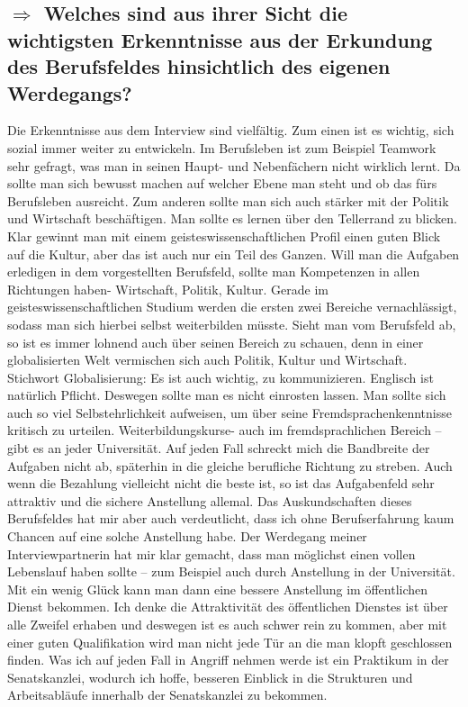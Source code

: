 \documentclass[12pt,headsepline,a4paper]{scrartcl}
\newcommand\quest[1]{\subsection*{$\Rightarrow$ #1}}
\begin{document}
\quest{Welches sind aus ihrer Sicht die wichtigsten Erkenntnisse aus der Erkundung des Berufsfeldes hinsichtlich des eigenen Werdegangs?}
Die Erkenntnisse aus dem Interview sind vielfältig. Zum einen ist es wichtig, sich sozial immer weiter zu entwickeln. Im Berufsleben ist zum Beispiel Teamwork sehr gefragt, was man in seinen Haupt- und Nebenfächern nicht wirklich lernt. Da sollte man sich bewusst machen auf welcher Ebene man steht und ob das fürs Berufsleben ausreicht.
Zum anderen sollte man sich auch stärker mit der Politik und Wirtschaft beschäftigen. Man sollte es lernen über den Tellerrand zu blicken. Klar gewinnt man mit einem geisteswissenschaftlichen Profil einen guten Blick auf die Kultur, aber das ist auch nur ein Teil des Ganzen. Will man die Aufgaben erledigen in dem  vorgestellten Berufsfeld, sollte man Kompetenzen in allen Richtungen haben- Wirtschaft, Politik, Kultur. Gerade im geisteswissenschaftlichen Studium werden die ersten zwei Bereiche vernachlässigt, sodass man sich hierbei selbst weiterbilden müsste. Sieht man vom Berufsfeld ab, so ist es immer lohnend auch über seinen Bereich zu schauen, denn in einer globalisierten Welt vermischen sich auch Politik, Kultur und Wirtschaft. 
Stichwort Globalisierung: Es ist auch wichtig, zu kommunizieren. Englisch ist natürlich Pflicht. Deswegen sollte man es nicht einrosten lassen. Man sollte sich auch so viel Selbstehrlichkeit aufweisen, um über seine Fremdsprachenkenntnisse kritisch zu urteilen. Weiterbildungskurse- auch im fremdsprachlichen Bereich – gibt es an jeder Universität.
Auf jeden Fall schreckt mich die Bandbreite der Aufgaben nicht ab, späterhin in die gleiche berufliche Richtung zu streben. Auch wenn die Bezahlung vielleicht nicht die beste ist, so ist das Aufgabenfeld sehr attraktiv und die sichere Anstellung allemal. Das Auskundschaften dieses Berufsfeldes hat mir aber auch verdeutlicht, dass ich ohne Berufserfahrung kaum Chancen auf eine solche Anstellung habe. Der Werdegang meiner Interviewpartnerin hat mir klar gemacht, dass man möglichst einen vollen Lebenslauf haben sollte -- zum Beispiel auch durch Anstellung in der Universität. Mit ein wenig Glück kann man dann eine bessere Anstellung im öffentlichen Dienst bekommen.
Ich denke die Attraktivität des öffentlichen Dienstes ist über alle Zweifel erhaben und deswegen ist es auch schwer rein zu kommen, aber mit einer guten Qualifikation wird man nicht jede Tür an die man klopft geschlossen finden. 
Was ich auf jeden Fall in Angriff nehmen werde ist ein Praktikum in der Senatskanzlei, wodurch ich hoffe, besseren Einblick in die Strukturen und Arbeitsabläufe innerhalb der Senatskanzlei zu bekommen.
\end{document}
